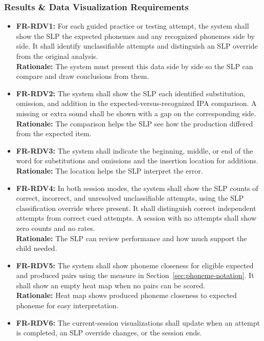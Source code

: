 \documentclass[12pt]{article}
\begin{document}
\subsubsection{Results \& Data Visualization Requirements}
\begin {itemize}
\item \textbf{FR-RDV1:} For each guided practice or testing attempt, the system shall show the SLP the expected phonemes and any recognized phonemes side by side. It shall identify unclassifiable attempts and distinguish an SLP override from the original analysis. \\
\textbf{Rationale:} The system must present this data side by side so the SLP can compare and draw conclusions from them. 
\item \textbf{FR-RDV2:} The system shall show the SLP each identified substitution, omission, and addition in the expected-versus-recognized IPA comparison. A missing or extra sound shall be shown with a gap on the corresponding side. \\
\textbf{Rationale:} The comparison helps the SLP see how the production differed from the expected item.
\item \textbf{FR-RDV3:} The system shall indicate the beginning, middle, or end of the word for substitutions and omissions and the insertion location for additions. \\
\textbf{Rationale:} The location helps the SLP interpret the error.
\item \textbf{FR-RDV4:} In both session modes, the system shall show the SLP
counts of correct, incorrect, and unresolved unclassifiable attempts, using
the SLP classification override where present. It shall distinguish correct
independent attempts from correct cued attempts. A session with no attempts
shall show zero counts and no rates. \\
\textbf{Rationale:} The SLP can review performance and how much support the child needed.
\item \textbf{FR-RDV5:} The system shall show phoneme closeness for eligible expected and produced pairs using the measure in Section~\ref{sec:phoneme-notation}. It shall show an empty heat map when no pairs can be scored. \\
\textbf{Rationale:} Heat map shows produced phoneme closeness to expected phoneme for easy interpretation.
\item \textbf{FR-RDV6:} The current-session visualizations shall update when an attempt is completed, an SLP override changes, or the session ends. \\

\end{itemize}
\end{document}
